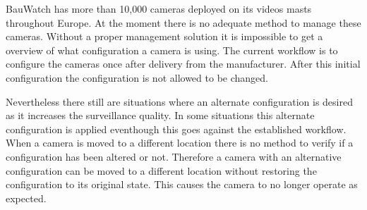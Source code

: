 BauWatch has more than 10,000 cameras deployed on its videos masts throughout Europe. At the moment there is no adequate method to manage these cameras.
Without a proper management solution it is impossible to get a overview of what configuration a camera is using.
The current workflow is to configure the cameras once after delivery from the manufacturer.
After this initial configuration the configuration is not allowed to be changed.

Nevertheless there still are situations where an alternate configuration is desired as it increases the surveillance quality.
In some situations this alternate configuration is applied eventhough this goes against the established workflow.
When a camera is moved to a different location there is no method to verify if a configuration has been altered or not.
Therefore a camera with an alternative configuration can be moved to a different location without restoring the configuration to its original state.
This causes the camera to no longer operate as expected.



